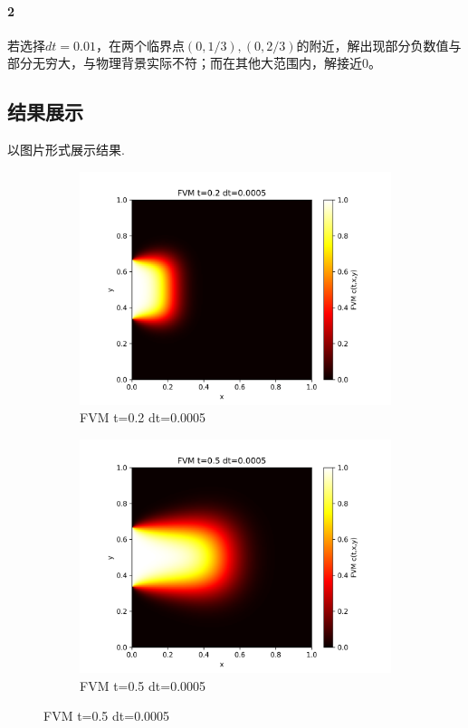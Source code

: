 \documentclass[11pt,a4 paper,one side]{article}
\begin{document}
\paragraph{2} 若选择$dt=0.01$，在两个临界点$(0,1/3),(0,2/3)$的附近，解出现部分负数值与部分无穷大，与物理背景实际不符；而在其他大范围内，解接近$0$。
\subsection{结果展示}
以图片形式展示结果.\begin{figure}[htbp]
    \centering
    \begin{subfigure}{0.45\textwidth}
        \includegraphics[width=\textwidth]{FVM t=0.2 dt=0.0005.png}
        \caption{FVM t=0.2 dt=0.0005}
        \label{FVM t=0.2 dt=0.0005}
    \end{subfigure}
    \hfill
    \begin{subfigure}{0.45\textwidth}
        \includegraphics[width=\textwidth]{FVM t=0.5 dt=0.0005.png}
        \caption{FVM t=0.5 dt=0.0005}
        \label{FVM t=0.5 dt=0.0005}
    \end{subfigure}
    

\end{figure}
\end{document}

